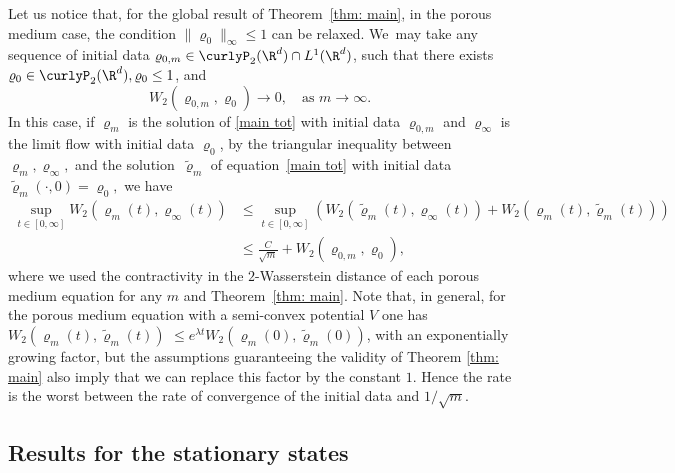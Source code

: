 \begin{remark}
Let us notice that, for the global result of Theorem~\ref{thm: main}, in the porous medium case, the condition $\|\varrho_0\|_\infty\leq 1$ can be relaxed. We~may take any sequence of initial data $\varrho_{0,m}\in \curlyP_2(\R^d)\cap L^1(\R^d)$, such that there exists $\varrho_{0}\in \curlyP_2(\R^d), \varrho_{0}\leq 1$, and
\begin{equation*}
W_2(\varrho_{0,m}, \varrho_{0}) \to 0, \quad\text{as } m\to\infty.
\end{equation*}
In this case, if $\varrho_m$ is the solution of \eqref{main tot} with initial data $\varrho_{0,m}$ and $\varrho_\infty$ is the limit flow with initial data $\varrho_0$, by the triangular inequality between $\varrho_m, \varrho_\infty,$ and the solution~$\tilde\varrho_m$ of equation~\eqref{main tot} with initial data $\tilde\varrho_m(\cdot,0)=\varrho_{0},$ we have
\begin{align*}
\sup_{t\in[0,\infty]} W_2(\varrho_m(t), \varrho_\infty(t)) &\leq \sup_{t\in[0,\infty]} (W_2(\tilde\varrho_m(t), \varrho_\infty(t))+ W_2(\varrho_m(t), \tilde\varrho_m(t)))\\
&\leq \frac{C}{\sqrt{m}} + W_2(\varrho_{0,m}, \varrho_{0}),
\end{align*}
where we used the contractivity in the $2$-Wasserstein distance of each porous medium equation for any $m$ and Theorem~\ref{thm: main}. Note that, in general, for the porous medium equation with a semi-convex potential $V$ one has $W_2(\varrho_m(t),\tilde\varrho_m(t)) $ $\leq e^{\lambda t}W_2(\varrho_m(0),\tilde\varrho_m(0))$, with an exponentially growing factor, but the assumptions guaranteeing the validity of Theorem \ref{thm: main} also imply that we can replace this factor by the constant $1$.
Hence the rate is the worst between the rate of convergence of the initial data and $1/\sqrt{m}$.
\end{remark}

\subsection{Results for the stationary states}

